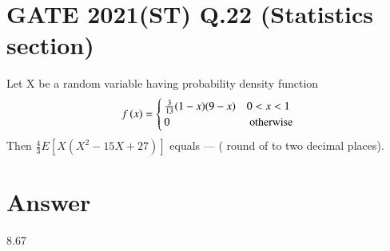 \documentclass[journal,12pt,twocolumn]{IEEEtran}
\begin{document}
\section*{GATE 2021(ST) Q.22 (Statistics section)}
Let X be a random variable having probability density function 
\begin{align*}
\label{eq:qpdf_X}
f\left(x\right) = 
\begin{cases}
\frac{3}{13}(1-x)(9-x) & 0 < x < 1
\\
0 & \text{ otherwise}
\end{cases}
\end{align*}
Then $\frac{4}{3} E[X(X^2 -15X + 27)]$ equals --- ( round of to two decimal places). \\
\section*{Answer}
8.67
\end{document}
